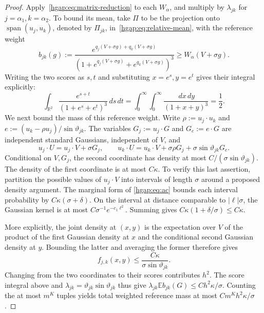 \documentclass[11pt,letterpaper]{article}
\theoremstyle{remark}
\newcommand{\E}{\mathbb E}
\newcommand{\R}{\mathbb R}
\newcommand{\dd}{\,d}
\begin{document}
\begin{proof}
Apply~\eqref{hgap:eq:matrix-reduction} to each $W_\alpha$, and multiply
by $\lambda_{jk}$ for $j=\alpha_1,k=\alpha_2$.
To bound its mean, take $\Pi$ to be the projection onto
$\operatorname{span}(u_j,u_k)$, denoted by $\Pi_{jk}$,
in~\eqref{hgap:eq:relative-mean}, with the reference weight
\[
 b_{jk}(g):=\frac{e^{q_j(V+\sigma g)+q_k(V+\sigma g)}}
                  {(1+e^{q_j(V+\sigma g)}+e^{q_k(V+\sigma g)})^3}
                  \ge W_\alpha(V+\sigma g).
\]
Writing the two scores as $s,t$ and substituting $x=e^s,y=e^t$
gives their integral explicitly:
\[
 \int_{\R^2}\frac{e^{s+t}}{(1+e^s+e^t)^3}\dd s\dd t
 =\int_0^\infty\int_0^\infty\frac{\dd x\dd y}{(1+x+y)^3}
 =\frac12.
\]
We next bound the mass of this reference weight. Write
$\rho:=u_j\cdot u_k$ and
$e:=(u_k-\rho u_j)/\sin\vartheta_{jk}$.
The variables $G_j:=u_j\cdot G$ and $G_e:=e\cdot G$ are independent
standard Gaussians, independent of $V$, and
\[
 u_j\cdot U=u_j\cdot V+\sigma G_j,\qquad
 u_k\cdot U=u_k\cdot V+\sigma\rho G_j
                           +\sigma\sin\vartheta_{jk}G_e.
\]
Conditional on $V,G_j$, the second coordinate has density at most
$C/(\sigma\sin\vartheta_{jk})$. The density of the first coordinate
is at most $C\kappa$. To verify this last assertion, partition the
possible values of $u_j\cdot V$ into intervals of length $\sigma$
around a proposed density argument. The marginal form of
\eqref{hgap:eq:ac} bounds each interval probability by
$C\kappa(\sigma+\delta)$. On the interval at distance comparable
to $|\ell|\sigma$, the Gaussian kernel is at most
$C\sigma^{-1}e^{-c_1\ell^2}$. Summing gives
$C\kappa(1+\delta/\sigma)\le C\kappa$.

More explicitly, the joint density at $(x,y)$ is the expectation over
$V$ of the product of the first Gaussian density at $x$ and the
conditional second Gaussian density at $y$. Bounding the latter and
averaging the former therefore gives
\[
 f_{j,k}(x,y)\le\frac{C\kappa}{\sigma\sin\vartheta_{jk}}.
\]
Changing from the two coordinates to their scores contributes $h^2$.
The score integral above and
$\lambda_{jk}=\vartheta_{jk}\sin\vartheta_{jk}$ thus give
$\lambda_{jk}\E b_{jk}(G)\le Ch^2\kappa/\sigma$.
Counting the at most $m^K$ tuples yields total weighted reference
mass at most $Cm^Kh^2\kappa/\sigma$.


\end{proof}
\end{document}
